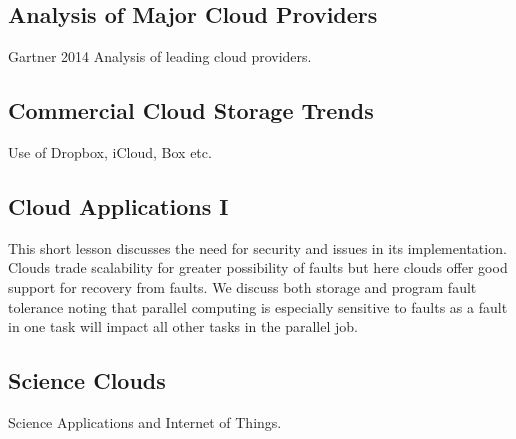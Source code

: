 
\subsection{Analysis of Major Cloud Providers}\label{analysis-of-major-cloud-providers}

Gartner 2014 Analysis of leading cloud providers.


\subsection{Commercial Cloud Storage Trends}\label{commercial-cloud-storage-trends}

Use of Dropbox, iCloud, Box etc.



\subsection{Cloud Applications I}\label{cloud-applications-i}

This short lesson discusses the need for security and issues in its
implementation. Clouds trade scalability for greater possibility of
faults but here clouds offer good support for recovery from faults. We
discuss both storage and program fault tolerance noting that parallel
computing is especially sensitive to faults as a fault in one task will
impact all other tasks in the parallel job.




\subsection{Science Clouds}\label{science-clouds}

Science Applications and Internet of Things.

